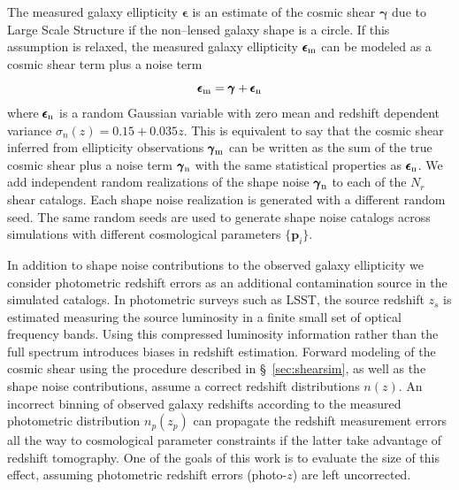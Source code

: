 \documentclass[reprint,aps,prd,superscriptaddress,showkeys,showpacs]{revtex4-1}
\newcommand{\bb}[1]{\mathbf{#1}}
\begin{document}
The measured galaxy ellipticity $\pmb{\epsilon}$ is an estimate of the cosmic shear $\pmb{\gamma}$ due to Large Scale Structure if the non--lensed galaxy shape is a circle. If this assumption is relaxed, the measured galaxy ellipticity $\pmb{\epsilon}_{\rm m}$ can be modeled as a cosmic shear term plus a noise term \citep{wlreview}
\begin{equation}
\pmb{\epsilon}_{\rm m} = \pmb{\gamma} + \pmb{\epsilon}_{\rm n}
\end{equation} 
%
where $\pmb{\epsilon}_{\rm n}$ is a random Gaussian variable with zero mean and redshift dependent variance $\sigma_n(z)=0.15+0.035z$. This is equivalent to say that the cosmic shear inferred from ellipticity observations $\pmb{\gamma}_{\rm m}$ can be written as the sum of the true cosmic shear plus a noise term $\pmb{\gamma}_{\rm n}$ with the same statistical properties as $\pmb{\epsilon}_{\rm n}$. 
We add independent random realizations of the shape noise $\pmb{\gamma}_{\rm n}$ to each of the $N_r$ shear catalogs. Each shape noise realization is generated with a different random seed. The same random seeds are used to generate shape noise catalogs across simulations with different cosmological parameters $\{\bb{p}_i\}$.

In addition to shape noise contributions to the observed galaxy ellipticity we consider photometric redshift errors as an additional contamination source in the simulated catalogs. In photometric surveys such as LSST, the source redshift $z_s$ is estimated measuring the source luminosity in a finite small set of optical frequency bands. Using this compressed luminosity information rather than the full spectrum introduces biases in redshift estimation. Forward modeling of the cosmic shear using the procedure described in \S~\ref{sec:shearsim}, as well as the shape noise contributions, assume a correct redshift distributions $n(z)$. An incorrect binning of observed galaxy redshifts according to the measured photometric distribution $n_p(z_p)$ can propagate the redshift measurement errors all the way to cosmological parameter constraints if the latter take advantage of redshift tomography. One of the goals of this work is to evaluate the size of this effect, assuming photometric redshift errors (photo-$z$) are left uncorrected. 
\end{document}
